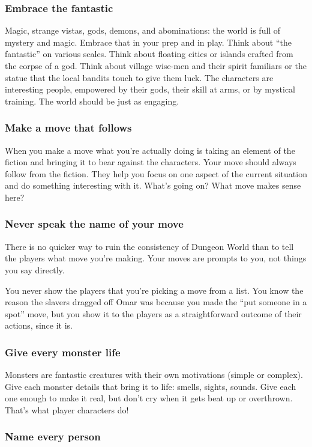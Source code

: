 \subsubsection{Embrace the fantastic}

Magic, strange vistas, gods, demons, and abominations: the world is full of mystery and magic. Embrace that in your prep and in play. Think about ``the fantastic'' on various scales. Think about floating cities or islands crafted from the corpse of a god. Think about village wise-men and their spirit familiars or the statue that the local bandits touch to give them luck. The characters are interesting people, empowered by their gods, their skill at arms, or by mystical training. The world should be just as engaging.
\subsubsection{Make a move that follows}

When you make a move what you're actually doing is taking an element of the fiction and bringing it to bear against the characters. Your move should always follow from the fiction. They help you focus on one aspect of the current situation and do something interesting with it. What's going on? What move makes sense here?
\subsubsection{Never speak the name of your move}

There is no quicker way to ruin the consistency of Dungeon World than to tell the players what move you're making. Your moves are prompts to you, not things you say directly.

You never show the players that you're picking a move from a list. You know the reason the slavers dragged off Omar was because you made the ``put someone in a spot'' move, but you show it to the players as a straightforward outcome of their actions, since it is.
\subsubsection{Give every monster life}

Monsters are fantastic creatures with their own motivations (simple or complex). Give each monster details that bring it to life: smells, sights, sounds. Give each one enough to make it real, but don't cry when it gets beat up or overthrown. That's what player characters do!
\subsubsection{Name every person}

